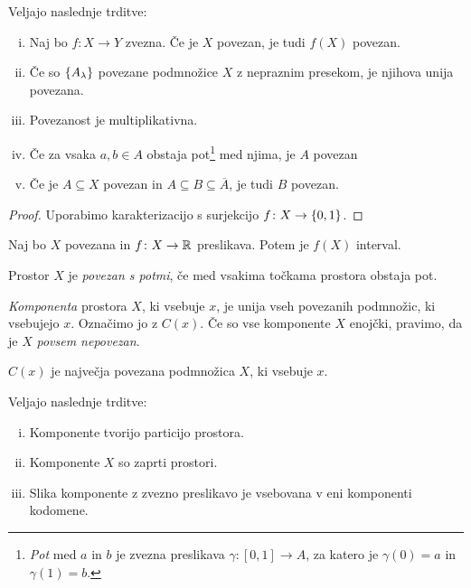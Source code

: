 \begin{izrek}
Veljajo naslednje trditve:

\begin{enumerate}[i)]
\item Naj bo $f \colon X \to Y$ zvezna. Če je $X$ povezan, je tudi
$f(X)$ povezan.
\item Če so $\left\{A_\lambda\right\}$ povezane podmnožice $X$ z nepraznim
presekom, je njihova unija povezana.
\item Povezanost je multiplikativna.
\item Če za vsaka $a, b \in A$ obstaja pot\footnote{\emph{Pot} med
$a$ in $b$ je zvezna preslikava $\gamma \colon [0,1] \to A$, za
katero je $\gamma(0) = a$ in $\gamma(1) = b$.} med njima, je $A$
povezan
\item Če je $A \subseteq X$ povezan in
$A \subseteq B \subseteq \overline{A}$, je tudi $B$ povezan.
\end{enumerate}
\end{izrek}

\begin{proof}
Uporabimo karakterizacijo s surjekcijo $f \colon X \to \left\{0,1\right\}$.
\end{proof}

\begin{izrek}
Naj bo $X$ povezana in $f \colon X \to \mathbb{R}$ preslikava. Potem je $f(X)$
interval.
\end{izrek}

\obvs

\begin{definicija}
Prostor $X$ je \emph{povezan s potmi}, če med vsakima točkama
prostora obstaja pot.
\end{definicija}

\begin{definicija}
\emph{Komponenta}
prostora $X$, ki vsebuje $x$, je unija vseh povezanih podmnožic,
ki vsebujejo $x$. Označimo jo z $C(x)$. Če so vse komponente $X$
enojčki, pravimo, da je $X$ \emph{povsem nepovezan}.
\end{definicija}

\begin{opomba}
$C(x)$ je največja povezana podmnožica $X$, ki vsebuje $x$.
\end{opomba}

\begin{izrek}
Veljajo naslednje trditve:

\begin{enumerate}[i)]
\item Komponente tvorijo particijo prostora.
\item Komponente $X$ so zaprti prostori.
\item Slika komponente z zvezno preslikavo je vsebovana v
eni komponenti kodomene.
\end{enumerate}
\end{izrek}

